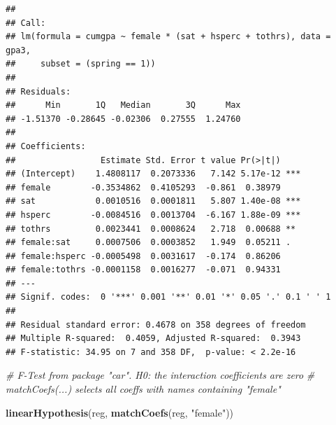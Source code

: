 \documentclass[]{book}
\newenvironment{Shaded}{\begin{snugshade}}{\end{snugshade}}
\newcommand{\CommentTok}[1]{\textcolor[rgb]{0.56,0.35,0.01}{\textit{#1}}}
\newcommand{\KeywordTok}[1]{\textcolor[rgb]{0.13,0.29,0.53}{\textbf{#1}}}
\newcommand{\NormalTok}[1]{#1}
\newcommand{\StringTok}[1]{\textcolor[rgb]{0.31,0.60,0.02}{#1}}
\begin{document}
\begin{verbatim}
## 
## Call:
## lm(formula = cumgpa ~ female * (sat + hsperc + tothrs), data = gpa3, 
##     subset = (spring == 1))
## 
## Residuals:
##      Min       1Q   Median       3Q      Max 
## -1.51370 -0.28645 -0.02306  0.27555  1.24760 
## 
## Coefficients:
##                 Estimate Std. Error t value Pr(>|t|)    
## (Intercept)    1.4808117  0.2073336   7.142 5.17e-12 ***
## female        -0.3534862  0.4105293  -0.861  0.38979    
## sat            0.0010516  0.0001811   5.807 1.40e-08 ***
## hsperc        -0.0084516  0.0013704  -6.167 1.88e-09 ***
## tothrs         0.0023441  0.0008624   2.718  0.00688 ** 
## female:sat     0.0007506  0.0003852   1.949  0.05211 .  
## female:hsperc -0.0005498  0.0031617  -0.174  0.86206    
## female:tothrs -0.0001158  0.0016277  -0.071  0.94331    
## ---
## Signif. codes:  0 '***' 0.001 '**' 0.01 '*' 0.05 '.' 0.1 ' ' 1
## 
## Residual standard error: 0.4678 on 358 degrees of freedom
## Multiple R-squared:  0.4059, Adjusted R-squared:  0.3943 
## F-statistic: 34.95 on 7 and 358 DF,  p-value: < 2.2e-16
\end{verbatim}

\begin{Shaded}
\begin{Highlighting}[]
\CommentTok{# F-Test from package "car". H0: the interaction coefficients are zero}
\CommentTok{# matchCoefs(...) selects all coeffs with names containing "female"}

\KeywordTok{linearHypothesis}\NormalTok{(reg, }\KeywordTok{matchCoefs}\NormalTok{(reg, }\StringTok{"female"}\NormalTok{))}
\end{Highlighting}
\end{Shaded}
\end{document}
